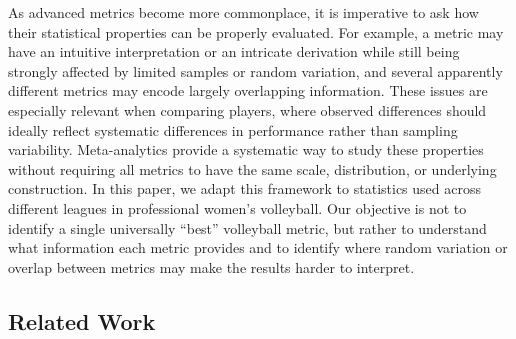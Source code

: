 \documentclass[10pt]{article}
\begin{document}
As advanced metrics become more commonplace, it is imperative to ask how their statistical properties can be properly evaluated. 
For example, a metric may have an intuitive interpretation or an intricate derivation while still being strongly affected by limited samples or random variation, and several apparently different metrics may encode largely overlapping information.
These issues are especially relevant when comparing players, where observed differences should ideally reflect systematic differences in performance rather than sampling variability.
Meta-analytics \citep{franks_meta-analytics_2016} provide a systematic way to study these properties without requiring all metrics to have the same scale, distribution, or underlying construction.
In this paper, we adapt this framework to statistics used across different leagues in professional women's volleyball.
Our objective is not to identify a single universally ``best'' volleyball metric, but rather to understand what information each metric provides and to identify where random variation or overlap between metrics may make the results harder to interpret.

\subsection{Related Work}
\end{document}
